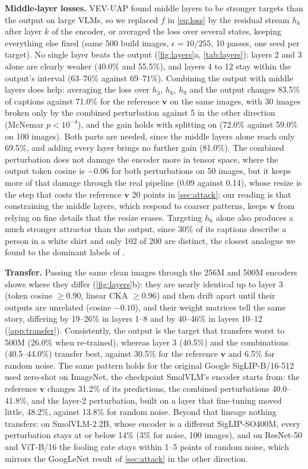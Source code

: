 \documentclass[10pt,twocolumn,letterpaper]{article}
\newcommand{\vv}{\boldsymbol{v}}
\begin{document}
\textbf{Middle-layer losses.} VEV-UAP \cite{kim2024vevuap} found middle layers to be stronger targets than the output on large VLMs, so we replaced $f$ in \cref{eq:loss} by the residual stream $h_k$ after layer $k$ of the encoder, or averaged the loss over several states, keeping everything else fixed (same 500 build images, $\epsilon=10/255$, 10 passes, one seed per target). No single layer beats the output (\cref{fig:layers}a, \cref{tab:layers}): layers 2 and 3 alone are clearly weaker (40.0\% and 55.5\%), and layers 4 to 12 stay within the output's interval (63--76\% against 69--71\%). Combining the output with middle layers does help: averaging the loss over $h_3$, $h_6$, $h_9$ and the output changes 83.5\% of captions against 71.0\% for the reference $\vv$ on the same images, with 30 images broken only by the combined perturbation against 5 in the other direction (McNemar $p<10^{-4}$), and the gain holds with splitting on (72.0\% against 59.0\% on 100 images). Both parts are needed, since the middle layers alone reach only 69.5\%, and adding every layer brings no further gain (81.0\%). The combined perturbation does not damage the encoder more in tensor space, where the output token cosine is $-0.06$ for both perturbations on 50 images, but it keeps more of that damage through the real pipeline (0.09 against 0.14), whose resize is the step that costs the reference $\vv$ 20 points in \cref{sec:attack}; our reading is that constraining the middle layers, which respond to coarser patterns, keeps $\vv$ from relying on fine details that the resize erases. Targeting $h_6$ alone also produces a much stronger attractor than the output, since 30\% of its captions describe a person in a white shirt and only 102 of 200 are distinct, the closest analogue we found to the dominant labels of \cite{moosavi2017universal}.

\textbf{Transfer.} Passing the same clean images through the 256M and 500M encoders shows where they differ (\cref{fig:layers}b): they are nearly identical up to layer 3 (token cosine $\ge0.90$, linear CKA $\ge0.96$) and then drift apart until their outputs are unrelated (cosine $-0.10$), and their weight matrices tell the same story, differing by 19--26\% in layers 1--8 and by 40--46\% in layers 10--12 (\cref{app:transfer}). Consistently, the output is the target that transfers worst to 500M (26.0\% when re-trained), whereas layer 3 (40.5\%) and the combinations (40.5--44.0\%) transfer best, against 30.5\% for the reference $\vv$ and 6.5\% for random noise. The same pattern holds for the original Google SigLIP-B/16-512 used zero-shot on ImageNet, the checkpoint SmolVLM's encoder starts from: the reference $\vv$ changes 31.2\% of its predictions, the combined perturbations 40.0--41.8\%, and the layer-2 perturbation, built on a layer that fine-tuning moved little, 48.2\%, against 13.8\% for random noise. Beyond that lineage nothing transfers: on SmolVLM-2.2B, whose encoder is a different SigLIP-SO400M, every perturbation stays at or below 14\% (3\% for noise, 100 images), and on ResNet-50 and ViT-B/16 the fooling rate stays within 1--5 points of random noise, which mirrors the GoogLeNet result of \cref{sec:attack} in the other direction.
\end{document}

